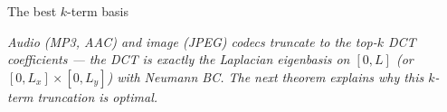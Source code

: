 \documentclass[final,t]{beamer}
\newlength{\colwidthA}\setlength{\colwidthA}{51.4cm}
\begin{document}
\begin{frame}[t,fragile]
\begin{columns}[t, onlytextwidth]
\begin{column}{\colwidthA}
{\begin{block}{\LARGE The best $k$-term basis}
  \begin{minipage}[c]{0.50\linewidth}\Large\justifying
    \noindent\itshape Audio (MP3, AAC) and image (JPEG) codecs truncate to the top-$k$ DCT coefficients --- the DCT is exactly the Laplacian eigenbasis on $[0,L]$ (or $[0,L_x]\times[0,L_y]$) with Neumann BC. The next theorem explains why this $k$-term truncation is optimal.
  \end{minipage}\hfill
  \begin{minipage}[c]{0.47\linewidth}\centering
    {\setlength{\fboxsep}{0.7em}\setlength{\fboxrule}{0.6pt}%
    }
  \end{minipage}\par
  \vspace{1.0ex}


\end{block}}
\end{column}
\end{columns}
\end{frame}
\end{document}
